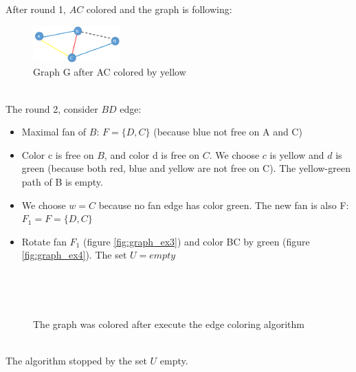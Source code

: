 After round 1, $AC$ colored and the graph is following:\\ 
\begin{figure}[h!]
\centering
\includegraphics[width=0.3\textwidth]{./images/graph_ex2}
\caption{Graph G after AC colored by yellow}
\label{fig:graph_ex2}
\end{figure}~\\
The round 2, consider $BD$ edge:
\begin{itemize}
\item Maximal fan of $B$: $F=\{D,C\}$ (because blue not free on A and C)
\item Color c is free on $B$, and color d is free on $C$. We choose $ c $ is yellow and $ d $ is green (because both red, blue and yellow are not free on C). The yellow-green path of B is empty.
\item We choose $w = C$ because no fan edge has color green. The new fan is also F: $F_1 = F = \{D,C\}$
\item Rotate fan $F_1$ (figure \ref{fig:graph_ex3}) and color BC by green (figure \ref{fig:graph_ex4}). The set $U=empty$
\end{itemize}~\\

\begin{figure}[h!]
\centering
{}~~
\caption{The graph was colored after execute the edge coloring algorithm}
\label{fig:graph_ex5}
\end{figure}~\\
The algorithm stopped by the set $U$ empty.
